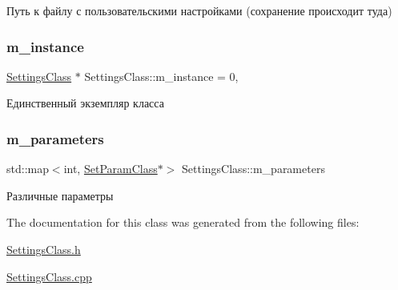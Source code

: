 Путь к файлу с пользовательскими настройками (сохранение происходит туда) 

\mbox{\label{class_settings_class_a42dc072ae3d60214386ca189003d92fb}} 
\subsubsection{\texorpdfstring{m\+\_\+instance}{m\_instance}}
{\footnotesize\ttfamily \hyperlink{class_settings_class}{Settings\+Class} $\ast$ Settings\+Class\+::m\+\_\+instance = 0\hspace{0.3cm}{\ttfamily [static]}, {\ttfamily [private]}}



Единственный экземпляр класса 

\mbox{\label{class_settings_class_ac36de25456667eac63fa41a643dbdc92}} 
\subsubsection{\texorpdfstring{m\+\_\+parameters}{m\_parameters}}
{\footnotesize\ttfamily std\+::map$<$int, \hyperlink{class_set_param_class}{Set\+Param\+Class}$\ast$$>$ Settings\+Class\+::m\+\_\+parameters\hspace{0.3cm}{\ttfamily [private]}}



Различные параметры 



The documentation for this class was generated from the following files\+:\begin{DoxyCompactItemize}
\item 
\hyperlink{_settings_class_8h}{Settings\+Class.\+h}\item 
\hyperlink{_settings_class_8cpp}{Settings\+Class.\+cpp}\end{DoxyCompactItemize}
